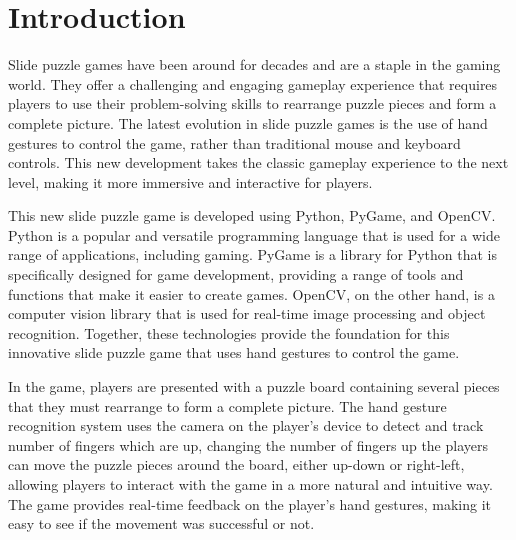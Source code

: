 \chapter{Introduction} %
Slide puzzle games have been around for decades and are a staple in the gaming world. They offer a challenging and engaging gameplay experience that requires players to use their problem-solving skills to rearrange puzzle pieces and form a complete picture. The latest evolution in slide puzzle games is the use of hand gestures to control the game, rather than traditional mouse and keyboard controls. This new development takes the classic gameplay experience to the next level, making it more immersive and interactive for players.

This new slide puzzle game is developed using Python, PyGame, and OpenCV. Python is a popular and versatile programming language that is used for a wide range of applications, including gaming. PyGame is a library for Python that is specifically designed for game development, providing a range of tools and functions that make it easier to create games. OpenCV, on the other hand, is a computer vision library that is used for real-time image processing and object recognition. Together, these technologies provide the foundation for this innovative slide puzzle game that uses hand gestures to control the game.

In the game, players are presented with a puzzle board containing several pieces that they must rearrange to form a complete picture. The hand gesture recognition system uses the camera on the player's device to detect and track number of fingers which are up, changing the number of fingers up the players can move the puzzle pieces around the board, either up-down or right-left, allowing players to interact with the game in a more natural and intuitive way. The game provides real-time feedback on the player's hand gestures, making it easy to see if the movement was successful or not.

